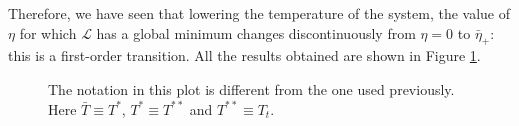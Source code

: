 \documentclass[../../Main/Main.tex]{subfiles}
\begin{document}
\begin{itemize}
Therefore, we have seen that lowering the temperature of the system, the value of \( \eta  \) for which \( \mathcal{L} \) has a global minimum changes discontinuously from \( \eta =0 \)  to \( \bar{\eta }_+  \): this is a first-order transition. All the results obtained are shown in Figure \ref{fig:16_p}.
  \begin{figure}[H]
  \begin{minipage}[c]{0.55\linewidth}
  \end{minipage}
  \begin{minipage}[]{0.55\linewidth}
  \centering
  \end{minipage}
  \caption{\label{fig:16_p} The notation in this plot is different from the one used previously. Here \( \bar{T} \equiv T^*  \), \( T^{*} \equiv T^{**} \) and \( T^{**} \equiv T_t \).  }
  \end{figure}
\end{itemize}
\end{document}
